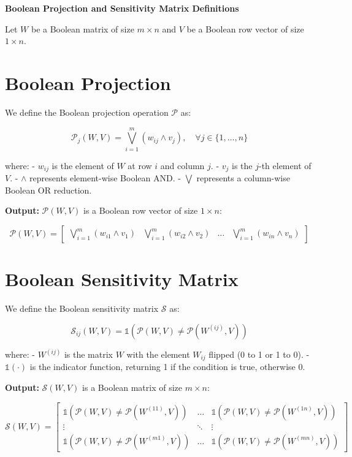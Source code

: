 \documentclass{article}
\begin{document}
\textbf{Boolean Projection and Sensitivity Matrix Definitions}

Let \( W \) be a Boolean matrix of size \( m \times n \) and \( V \) be a Boolean row vector of size \( 1 \times n \).

\section*{Boolean Projection}
We define the Boolean projection operation \( \mathcal{P} \) as:

\[
\mathcal{P}_j(W, V) = \bigvee_{i=1}^{m} (w_{ij} \land v_j), \quad \forall j \in \{1, \dots, n\}
\]

where:
- \( w_{ij} \) is the element of \( W \) at row \( i \) and column \( j \).
- \( v_j \) is the \( j \)-th element of \( V \).
- \( \land \) represents element-wise Boolean AND.
- \( \bigvee \) represents a column-wise Boolean OR reduction.

\textbf{Output:} \( \mathcal{P}(W, V) \) is a Boolean row vector of size \( 1 \times n \):

\[
\mathcal{P}(W, V) =
\begin{bmatrix}
\bigvee_{i=1}^{m} (w_{i1} \land v_1) &
\bigvee_{i=1}^{m} (w_{i2} \land v_2) &
\dots &
\bigvee_{i=1}^{m} (w_{in} \land v_n)
\end{bmatrix}
\]

\section*{Boolean Sensitivity Matrix}
We define the Boolean sensitivity matrix \( \mathcal{S} \) as:

\[
\mathcal{S}_{ij}(W, V) = \mathbb{1} \left( \mathcal{P}(W, V) \neq \mathcal{P}(W^{(ij)}, V) \right)
\]

where:
- \( W^{(ij)} \) is the matrix \( W \) with the element \( W_{ij} \) flipped (0 to 1 or 1 to 0).
- \( \mathbb{1}(\cdot) \) is the indicator function, returning 1 if the condition is true, otherwise 0.

\textbf{Output:} \( \mathcal{S}(W, V) \) is a Boolean matrix of size \( m \times n \):

\[
\mathcal{S}(W, V) =
\begin{bmatrix}
\mathbb{1} \left( \mathcal{P}(W, V) \neq \mathcal{P}(W^{(11)}, V) \right) & \dots & \mathbb{1} \left( \mathcal{P}(W, V) \neq \mathcal{P}(W^{(1n)}, V) \right) \\
\vdots & \ddots & \vdots \\
\mathbb{1} \left( \mathcal{P}(W, V) \neq \mathcal{P}(W^{(m1)}, V) \right) & \dots & \mathbb{1} \left( \mathcal{P}(W, V) \neq \mathcal{P}(W^{(mn)}, V) \right)
\end{bmatrix}
\]
\end{document}

